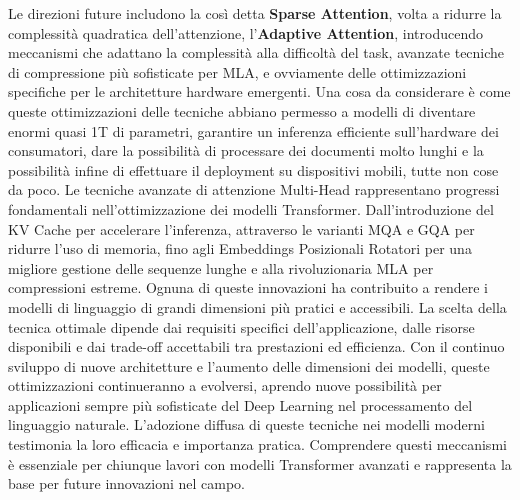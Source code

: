 Le direzioni future includono la così detta \textbf{Sparse Attention}, volta a ridurre la complessità quadratica dell'attenzione, l'\textbf{Adaptive Attention}, introducendo meccanismi che adattano la complessità alla difficoltà del task, avanzate tecniche di compressione più sofisticate per MLA, e ovviamente delle ottimizzazioni specifiche per le architetture hardware emergenti. Una cosa da considerare è come queste ottimizzazioni delle tecniche abbiano permesso a modelli di diventare enormi quasi 1T di parametri, garantire un inferenza efficiente sull'hardware dei consumatori, dare la possibilità di processare dei documenti molto lunghi e la possibilità infine di effettuare il deployment su dispositivi mobili, tutte non cose da poco. Le tecniche avanzate di attenzione Multi-Head rappresentano progressi fondamentali nell'ottimizzazione dei modelli Transformer. Dall'introduzione del KV Cache per accelerare l'inferenza, attraverso le varianti MQA e GQA per ridurre l'uso di memoria, fino agli Embeddings Posizionali Rotatori per una migliore gestione delle sequenze lunghe e alla rivoluzionaria MLA per compressioni estreme. Ognuna di queste innovazioni ha contribuito a rendere i modelli di linguaggio di grandi dimensioni più pratici e accessibili. La scelta della tecnica ottimale dipende dai requisiti specifici dell'applicazione, dalle risorse disponibili e dai trade-off accettabili tra prestazioni ed efficienza. Con il continuo sviluppo di nuove architetture e l'aumento delle dimensioni dei modelli, queste ottimizzazioni continueranno a evolversi, aprendo nuove possibilità per applicazioni sempre più sofisticate del Deep Learning nel processamento del linguaggio naturale. L'adozione diffusa di queste tecniche nei modelli moderni testimonia la loro efficacia e importanza pratica. Comprendere questi meccanismi è essenziale per chiunque lavori con modelli Transformer avanzati e rappresenta la base per future innovazioni nel campo.